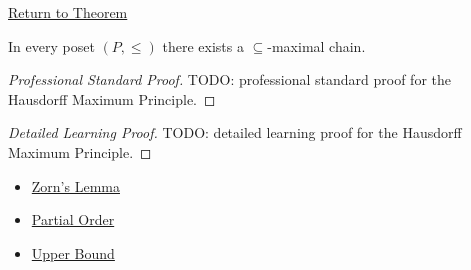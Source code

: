 \newpage
{}
\label{prf:hausdorff}

\begin{remark*}[Return]
\hyperref[thm:hausdorff]{Return to Theorem}
\end{remark*}

\begin{theorem*}
In every poset $(P, \leq)$ there exists a $\subseteq$-maximal chain.
\end{theorem*}

\begin{proof}[Professional Standard Proof]
\LRAProofBodyStart
TODO: professional standard proof for the Hausdorff Maximum Principle.
\end{proof}

\begin{proof}[Detailed Learning Proof]
\LRAProofBodyStart
TODO: detailed learning proof for the Hausdorff Maximum Principle.
\end{proof}

\begin{remark*}
\end{remark*}

\begin{dependencies}
\begin{itemize}
  \item \hyperref[thm:zorn]{Zorn's Lemma}
  \item \hyperref[def:partial-order]{Partial Order}
  \item \hyperref[def:upper-bound]{Upper Bound}
\end{itemize}
\end{dependencies}

\clearpage
